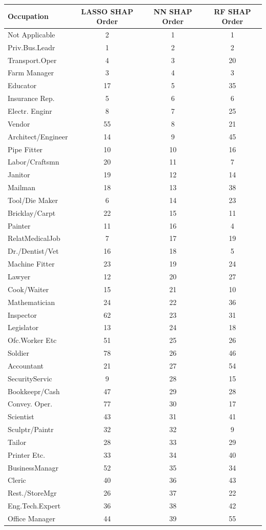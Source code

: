 \begin{tabular}{lccc}
\hline\hline
Occupation & LASSO SHAP Order & NN SHAP Order & RF SHAP Order \\
\hline
Not Applicable&2&1&1\\
Priv.Bus.Leadr&1&2&2\\
Transport.Oper&4&3&20\\
Farm Manager&3&4&3\\
Educator&17&5&35\\
Insurance Rep.&5&6&6\\
Electr. Enginr&8&7&25\\
Vendor&55&8&21\\
Architect/Engineer&14&9&45\\
Pipe Fitter&10&10&16\\
Labor/Craftsmn&20&11&7\\
Janitor&19&12&14\\
Mailman&18&13&38\\
Tool/Die Maker&6&14&23\\
Bricklay/Carpt&22&15&11\\
Painter&11&16&4\\
RelatMedicalJob&7&17&19\\
Dr./Dentist/Vet&16&18&5\\
Machine Fitter&23&19&24\\
Lawyer&12&20&27\\
Cook/Waiter&15&21&10\\
Mathematician&24&22&36\\
Inspector&62&23&31\\
Legislator&13&24&18\\
Ofc.Worker Etc&51&25&26\\
Soldier&78&26&46\\
Accountant&21&27&54\\
SecurityServic&9&28&15\\
Bookkeepr/Cash&47&29&28\\
Convey. Oper.&77&30&17\\
Scientist&43&31&41\\
Sculptr/Paintr&32&32&9\\
Tailor&28&33&29\\
Printer Etc.&33&34&40\\
BusinessManagr&52&35&34\\
Cleric&40&36&43\\
Rest./StoreMgr&26&37&22\\
Eng.Tech.Expert&36&38&42\\
Office Manager&44&39&55\\

\end{tabular}
